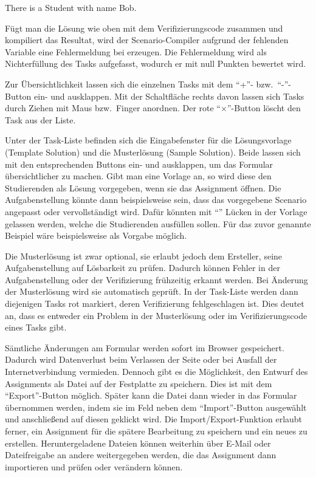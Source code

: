 \begin{mdcodeblock}
    There is a Student with name Bob.
\end{mdcodeblock}

Fügt man die Lösung wie oben mit dem Verifizierungscode zusammen und kompiliert das Resultat, wird der Scenario-Compiler aufgrund der fehlenden Variable  eine Fehlermeldung bei  erzeugen.
Die Fehlermeldung wird als Nichterfüllung des Tasks aufgefasst, wodurch er mit null Punkten bewertet wird.

Zur Übersichtlichkeit lassen sich die einzelnen Tasks mit dem ``+''- bzw.\ ``-''-Button ein- und ausklappen.
Mit der Schaltfläche rechts davon lassen sich Tasks durch Ziehen mit Maus bzw.\ Finger anordnen.
Der rote ``$\times$''-Button löscht den Task aus der Liste.

Unter der Task-Liste befinden sich die Eingabefenster für die Lösungsvorlage (Template Solution) und die Musterlösung (Sample Solution).
Beide lassen sich mit den entsprechenden Buttons ein- und ausklappen, um das Formular übersichtlicher zu machen.
Gibt man eine Vorlage an, so wird diese den Studierenden als Lösung vorgegeben, wenn sie das Assignment öffnen.
Die Aufgabenstellung könnte dann beispielsweise sein, dass das vorgegebene Scenario angepasst oder vervollständigt wird.
Dafür könnten mit ``'' Lücken in der Vorlage gelassen werden, welche die Studierenden ausfüllen sollen.
Für das zuvor genannte Beispiel wäre beispielsweise  als Vorgabe möglich.

Die Musterlösung ist zwar optional, sie erlaubt jedoch dem Ersteller, seine Aufgabenstellung auf Lösbarkeit zu prüfen.
Dadurch können Fehler in der Aufgabenstellung oder der Verifizierung frühzeitig erkannt werden.
Bei Änderung der Musterlösung wird sie automatisch geprüft.
In der Task-Liste werden dann diejenigen Tasks rot markiert, deren Verifizierung fehlgeschlagen ist.
Dies deutet an, dass es entweder ein Problem in der Musterlösung oder im Verifizierungscode eines Tasks gibt.

Sämtliche Änderungen am Formular werden sofort im Browser gespeichert.
Dadurch wird Datenverlust beim Verlassen der Seite oder bei Ausfall der Internetverbindung vermieden.
Dennoch gibt es die Möglichkeit, den Entwurf des Assignments als Datei auf der Festplatte zu speichern.
Dies ist mit dem ``Export''-Button möglich.
Später kann die Datei dann wieder in das Formular übernommen werden, indem sie im Feld neben dem ``Import''-Button ausgewählt und anschließend auf diesen geklickt wird.
Die Import/Export-Funktion erlaubt ferner, ein Assignment für die spätere Bearbeitung zu speichern und ein neues zu erstellen.
Heruntergeladene Dateien können weiterhin über E-Mail oder Dateifreigabe an andere weitergegeben werden, die das Assignment dann importieren und prüfen oder verändern können.

